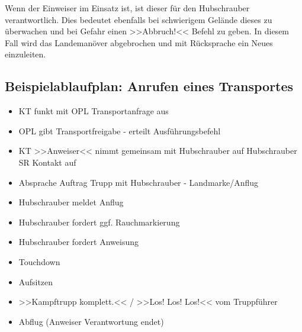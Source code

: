 	Wenn der Einweiser im Einsatz ist, ist dieser für den Hubschrauber verantwortlich. Dies bedeutet ebenfalls bei schwierigem Gelände dieses zu überwachen und bei Gefahr einen >>Abbruch!<< Befehl zu geben. In diesem Fall wird das Landemanöver abgebrochen und mit Rücksprache ein Neues einzuleiten.

\subsection{Beispielablaufplan: Anrufen eines Transportes}
	\begin{itemize}
		\item \ac{KT} funkt mit OPL Transportanfrage aus
    		\item \ac{OPL} gibt Transportfreigabe - erteilt Ausführungsbefehl
    		\item KT >>Anweiser<< nimmt gemeinsam mit Hubschrauber auf Hubschrauber \ac{SR} Kontakt auf
    		\item Absprache Auftrag Trupp mit Hubschrauber - Landmarke/Anflug
			\item Hubschrauber meldet Anflug
    		\item Hubschrauber fordert ggf. Rauchmarkierung
    		\item Hubschrauber fordert Anweisung
    		\item Touchdown
    		\item Aufsitzen
    		\item >>Kampftrupp komplett.<< / >>Los! Los! Los!<< vom Truppführer
    		\item Abflug (Anweiser Verantwortung endet)
	\end{itemize}
